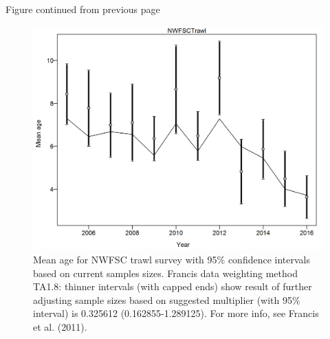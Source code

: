 \documentclass[12pt,]{article}
\begin{document}
\begin{center} 

              Figure continued from previous page 

             \end{center}

\begin{figure}[htbp]
\centering
\includegraphics{r4ss/plots_mod1/comp_condAALfit_data_weighting_TA1.8_condAgeNWFSCTrawl.png}
\caption{Mean age for NWFSC trawl survey with 95\% confidence intervals
based on current samples sizes. Francis data weighting method TA1.8:
thinner intervals (with capped ends) show result of further adjusting
sample sizes based on suggested multiplier (with 95\% interval) is
0.325612 (0.162855-1.289125). For more info, see Francis et al. (2011).
\label{fig:comp_condAALfit_data_weighting_TA1.8_condAgeNWFSCTrawl}}
\end{figure}
\end{document}
